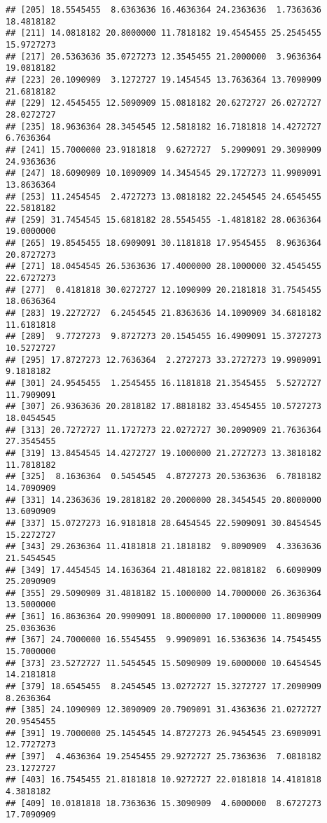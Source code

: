 \documentclass[]{book}
\begin{document}
\begin{verbatim}
## [205] 18.5545455  8.6363636 16.4636364 24.2363636  1.7363636 18.4818182
## [211] 14.0818182 20.8000000 11.7818182 19.4545455 25.2545455 15.9727273
## [217] 20.5363636 35.0727273 12.3545455 21.2000000  3.9636364 19.0818182
## [223] 20.1090909  3.1272727 19.1454545 13.7636364 13.7090909 21.6818182
## [229] 12.4545455 12.5090909 15.0818182 20.6272727 26.0272727 28.0272727
## [235] 18.9636364 28.3454545 12.5818182 16.7181818 14.4272727  6.7636364
## [241] 15.7000000 23.9181818  9.6272727  5.2909091 29.3090909 24.9363636
## [247] 18.6090909 10.1090909 14.3454545 29.1727273 11.9909091 13.8636364
## [253] 11.2454545  2.4727273 13.0818182 22.2454545 24.6545455 22.5818182
## [259] 31.7454545 15.6818182 28.5545455 -1.4818182 28.0636364 19.0000000
## [265] 19.8545455 18.6909091 30.1181818 17.9545455  8.9636364 20.8727273
## [271] 18.0454545 26.5363636 17.4000000 28.1000000 32.4545455 22.6727273
## [277]  0.4181818 30.0272727 12.1090909 20.2181818 31.7545455 18.0636364
## [283] 19.2272727  6.2454545 21.8363636 14.1090909 34.6818182 11.6181818
## [289]  9.7727273  9.8727273 20.1545455 16.4909091 15.3727273 10.5272727
## [295] 17.8727273 12.7636364  2.2727273 33.2727273 19.9909091  9.1818182
## [301] 24.9545455  1.2545455 16.1181818 21.3545455  5.5272727 11.7909091
## [307] 26.9363636 20.2818182 17.8818182 33.4545455 10.5727273 18.0454545
## [313] 20.7272727 11.1727273 22.0272727 30.2090909 21.7636364 27.3545455
## [319] 13.8454545 14.4272727 19.1000000 21.2727273 13.3818182 11.7818182
## [325]  8.1636364  0.5454545  4.8727273 20.5363636  6.7818182 14.7090909
## [331] 14.2363636 19.2818182 20.2000000 28.3454545 20.8000000 13.6090909
## [337] 15.0727273 16.9181818 28.6454545 22.5909091 30.8454545 15.2272727
## [343] 29.2636364 11.4181818 21.1818182  9.8090909  4.3363636 21.5454545
## [349] 17.4454545 14.1636364 21.4818182 22.0818182  6.6090909 25.2090909
## [355] 29.5090909 31.4818182 15.1000000 14.7000000 26.3636364 13.5000000
## [361] 16.8636364 20.9909091 18.8000000 17.1000000 11.8090909 25.0363636
## [367] 24.7000000 16.5545455  9.9909091 16.5363636 14.7545455 15.7000000
## [373] 23.5272727 11.5454545 15.5090909 19.6000000 10.6454545 14.2181818
## [379] 18.6545455  8.2454545 13.0272727 15.3272727 17.2090909  8.2636364
## [385] 24.1090909 12.3090909 20.7909091 31.4363636 21.0272727 20.9545455
## [391] 19.7000000 25.1454545 14.8727273 26.9454545 23.6909091 12.7727273
## [397]  4.4636364 19.2545455 29.9272727 25.7363636  7.0818182 23.1272727
## [403] 16.7545455 21.8181818 10.9272727 22.0181818 14.4181818  4.3818182
## [409] 10.0181818 18.7363636 15.3090909  4.6000000  8.6727273 17.7090909

\end{verbatim}
\end{document}
